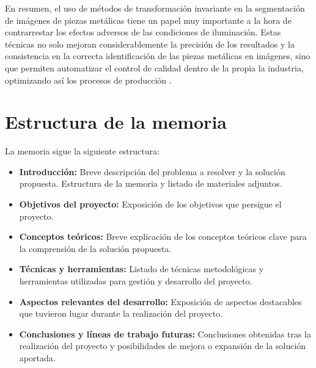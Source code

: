 En resumen, el uso de métodos de transformación invariante en la segmentación de imágenes de piezas metálicas tiene un papel muy importante a la hora de contrarrestar los efectos adversos de las condiciones de iluminación. Estas técnicas no solo mejoran considerablemente la precisión de los resultados y la consistencia en la correcta identificación de las piezas metálicas en imágenes, sino que permiten automatizar el control de calidad dentro de la propia la industria, optimizando así los procesos de producción \cite{jmmp6060141}.


%
%

\section{Estructura de la memoria}\label{estructura-de-la-memoria}

La memoria sigue la siguiente estructura:

\begin{itemize}
    \tightlist
        \item
            \textbf{Introducción:} Breve descripción del problema a resolver y la solución propuesta. Estructura de la memoria y listado de materiales adjuntos.
        \item
            \textbf{Objetivos del proyecto:} Exposición de los objetivos que persigue el proyecto.
        \item
            \textbf{Conceptos teóricos:} Breve explicación de los conceptos teóricos clave para la comprensión de la solución propuesta.
        \item
            \textbf{Técnicas y herramientas:} Listado de técnicas metodológicas y herramientas utilizadas para gestión y desarrollo del proyecto.
        \item
            \textbf{Aspectos relevantes del desarrollo:} Exposición de aspectos destacables que tuvieron lugar durante la realización del proyecto.
        \item
            \textbf{Conclusiones y líneas de trabajo futuras:} Conclusiones obtenidas tras la realización del proyecto y posibilidades de mejora o expansión de la solución aportada.
\end{itemize}

